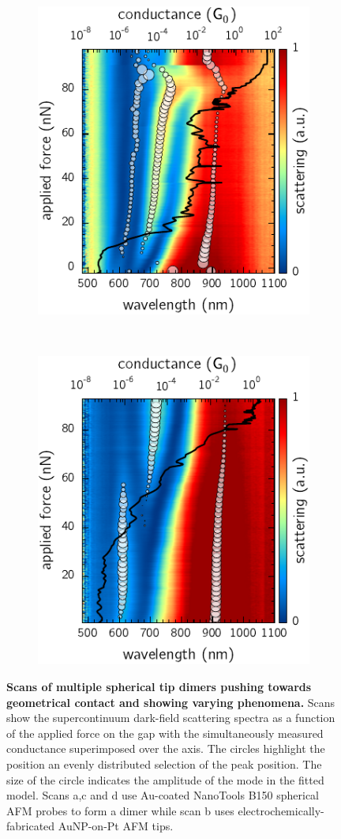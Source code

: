 \documentclass[a4paper]{article}
\begin{document}
\begin{figure}[h]
\\
\begin{subfigure}[b]{0.4\textwidth}
	\flushright
	\includegraphics{figures/spherical_tip_dimer_1_tunnelling_focus}
	\label{fig:scan3}
\end{subfigure}
~
\begin{subfigure}[b]{0.4\textwidth}
	\flushleft
	\includegraphics{figures/spherical_tip_dimer_2_tunnelling_focus}
	\label{fig:scan4}
\end{subfigure}
\caption[Scans of multiple spherical tip dimers pushing towards geometrical contact and showing varying phenomena]{\textbf{Scans of multiple spherical tip dimers pushing towards geometrical contact and showing varying phenomena.} Scans show the supercontinuum dark-field scattering spectra as a function of the applied force on the gap with the simultaneously measured conductance superimposed over the axis. The circles highlight the position an evenly distributed selection of the peak position. The size of the circle indicates the amplitude of the mode in the fitted model. Scans a,c and d use Au-coated NanoTools B150 spherical AFM probes to form a dimer while scan b uses electrochemically-fabricated AuNP-on-Pt AFM tips.}

\end{figure}
\end{document}

